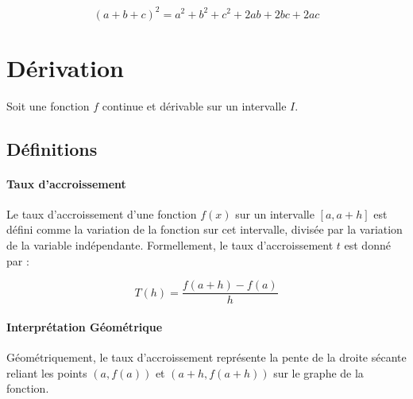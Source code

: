 \documentclass{report}
\begin{document}
      \begin{tcolorbox}[colback=white, colframe=black, boxrule=0.5pt, width=\textwidth]\[(a+b+c)^2 = a^2 + b^2 +c^2 +2ab+2bc+ 2ac\]\end{tcolorbox}
    

    




    \newpage





    \section{Dérivation}
    \label{deriv}


    Soit une fonction $f$ continue et dérivable sur un intervalle $I$.


    \subsection{Définitions}

     \paragraph{Taux d'accroissement}

    Le taux d'accroissement d'une fonction \( f(x) \) sur un intervalle \( [a, a+h] \) est défini comme la variation de la fonction sur cet intervalle, divisée par la variation de la variable indépendante. Formellement, le taux d'accroissement $t$ est donné par :

    \[ T(h) = \frac{f(a+h) - f(a)}{h} \]

    \paragraph{Interprétation Géométrique}

    Géométriquement, le taux d'accroissement représente la pente de la droite sécante reliant les points \( (a, f(a)) \) et \( (a+h, f(a+h)) \) sur le graphe de la fonction.
\end{document}
